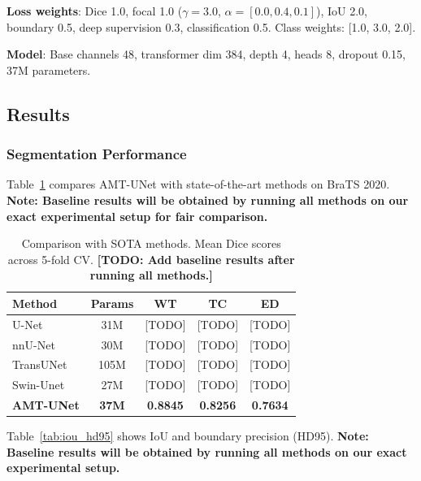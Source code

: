 \documentclass[runningheads]{llncs}
\begin{document}
\textbf{Loss weights}: Dice 1.0, focal 1.0 ($\gamma=3.0$, $\alpha=[0.0, 0.4, 0.1]$), IoU 2.0, boundary 0.5, deep supervision 0.3, classification 0.5. Class weights: [1.0, 3.0, 2.0].

\textbf{Model}: Base channels 48, transformer dim 384, depth 4, heads 8, dropout 0.15, 37M parameters.

\subsection{Results}

\subsubsection{Segmentation Performance}

Table~\ref{tab:comparison} compares AMT-UNet with state-of-the-art methods on BraTS 2020. \textbf{Note: Baseline results will be obtained by running all methods on our exact experimental setup for fair comparison.}

\begin{table}[t]
\centering
\caption{Comparison with SOTA methods. Mean Dice scores across 5-fold CV. \textbf{[TODO: Add baseline results after running all methods.]}}
\label{tab:comparison}
\begin{tabular}{lcccc}
\toprule
Method & Params & WT & TC & ED \\
\midrule
U-Net \cite{ronneberger2015unet} & 31M & [TODO] & [TODO] & [TODO] \\
nnU-Net \cite{isensee2021nnu} & 30M & [TODO] & [TODO] & [TODO] \\
TransUNet \cite{chen2021transunet} & 105M & [TODO] & [TODO] & [TODO] \\
Swin-Unet \cite{cao2022swin} & 27M & [TODO] & [TODO] & [TODO] \\
\midrule
\textbf{AMT-UNet} & \textbf{37M} & \textbf{0.8845} & \textbf{0.8256} & \textbf{0.7634} \\
\bottomrule
\end{tabular}
\end{table}

Table~\ref{tab:iou_hd95} shows IoU and boundary precision (HD95). \textbf{Note: Baseline results will be obtained by running all methods on our exact experimental setup.}
\end{document}
